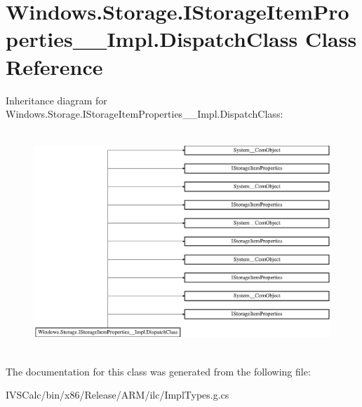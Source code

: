 \hypertarget{class_windows_1_1_storage_1_1_i_storage_item_properties_____impl_1_1_dispatch_class}{}\section{Windows.\+Storage.\+I\+Storage\+Item\+Properties\+\_\+\+\_\+\+Impl.\+Dispatch\+Class Class Reference}
\label{class_windows_1_1_storage_1_1_i_storage_item_properties_____impl_1_1_dispatch_class}
Inheritance diagram for Windows.\+Storage.\+I\+Storage\+Item\+Properties\+\_\+\+\_\+\+Impl.\+Dispatch\+Class\+:\begin{figure}[H]
\begin{center}
\leavevmode
\includegraphics[height=8.346883cm]{class_windows_1_1_storage_1_1_i_storage_item_properties_____impl_1_1_dispatch_class}
\end{center}
\end{figure}


The documentation for this class was generated from the following file\+:\begin{DoxyCompactItemize}
\item 
I\+V\+S\+Calc/bin/x86/\+Release/\+A\+R\+M/ilc/Impl\+Types.\+g.\+cs\end{DoxyCompactItemize}
